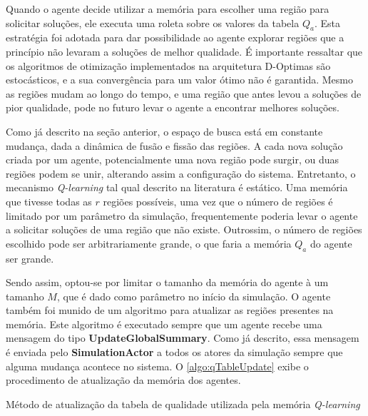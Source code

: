 Quando o agente decide utilizar a memória para escolher uma região para solicitar soluções, ele executa uma roleta sobre os valores da tabela $Q_a$. Esta estratégia foi adotada para dar possibilidade ao agente explorar regiões que a princípio não levaram a soluções de melhor qualidade. É importante ressaltar que os algoritmos de otimização implementados na arquitetura D-Optimas são estocásticos, e a sua convergência para um valor ótimo não é garantida. Mesmo as regiões mudam ao longo do tempo, e uma região que antes levou a soluções de pior qualidade, pode no futuro levar o agente a encontrar melhores soluções.

Como já descrito na seção anterior, o espaço de busca está em constante mudança, dada a dinâmica de fusão e fissão das regiões. A cada nova solução criada por um agente, potencialmente uma nova região pode surgir, ou duas regiões podem se unir, alterando assim a configuração do sistema. Entretanto, o mecanismo \textit{Q-learning} tal qual descrito na literatura é estático. Uma memória que tivesse todas as $r$ regiões possíveis, uma vez que o número de regiões é limitado por um parâmetro da simulação, frequentemente poderia levar o agente a solicitar soluções de uma região que não existe. Outrossim, o número de regiões escolhido pode ser arbitrariamente grande, o que faria a memória $Q_a$ do agente ser grande. 

Sendo assim, optou-se por limitar o tamanho da memória do agente à um tamanho $M$, que é dado como parâmetro no início da simulação. O agente também foi munido de um algoritmo para atualizar as regiões presentes na memória. Este algoritmo é executado sempre que um agente recebe uma mensagem do tipo \textbf{UpdateGlobalSummary}. Como já descrito, essa mensagem é enviada pelo \textbf{SimulationActor} a todos os atores da simulação sempre que alguma mudança acontece no sistema. O \autoref{algo:qTableUpdate} exibe o procedimento de atualização da memória dos agentes.

\begin{algorithm}[H]
\caption{Método de atualização da tabela de qualidade utilizada pela memória \textit{Q-learning}}
\label{algo:qTableUpdate}
\begin{algorithmic}[1]
    \State {} 
\end{algorithmic}
\end{algorithm}

